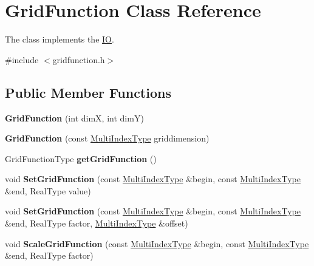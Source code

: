 \hypertarget{class_grid_function}{\section{Grid\-Function Class Reference}
\label{class_grid_function}
}


The class implements the \hyperlink{class_i_o}{I\-O}.  




{\ttfamily \#include $<$gridfunction.\-h$>$}

\subsection*{Public Member Functions}
\begin{DoxyCompactItemize}
\item 
\hypertarget{class_grid_function_a798c74f3481fc35a7ce39e2136fc96c5}{{\bfseries Grid\-Function} (int dim\-X, int dim\-Y)}\label{class_grid_function_a798c74f3481fc35a7ce39e2136fc96c5}

\item 
\hypertarget{class_grid_function_a7e13b13c332e7278317d927271d8f495}{{\bfseries Grid\-Function} (const \hyperlink{class_array}{Multi\-Index\-Type} griddimension)}\label{class_grid_function_a7e13b13c332e7278317d927271d8f495}

\item 
\hypertarget{class_grid_function_a22f2c9d48993df03e959bbe74569660a}{Grid\-Function\-Type {\bfseries get\-Grid\-Function} ()}\label{class_grid_function_a22f2c9d48993df03e959bbe74569660a}

\item 
\hypertarget{class_grid_function_a64fce241fb08877d1b8289fe755c2a2f}{void {\bfseries Set\-Grid\-Function} (const \hyperlink{class_array}{Multi\-Index\-Type} \&begin, const \hyperlink{class_array}{Multi\-Index\-Type} \&end, Real\-Type value)}\label{class_grid_function_a64fce241fb08877d1b8289fe755c2a2f}

\item 
\hypertarget{class_grid_function_adc4e126ab14dd32a55243cb75b1c2083}{void {\bfseries Set\-Grid\-Function} (const \hyperlink{class_array}{Multi\-Index\-Type} \&begin, const \hyperlink{class_array}{Multi\-Index\-Type} \&end, Real\-Type factor, \hyperlink{class_array}{Multi\-Index\-Type} \&offset)}\label{class_grid_function_adc4e126ab14dd32a55243cb75b1c2083}

\item 
\hypertarget{class_grid_function_a8970655a48c5af01d053593bdd475068}{void {\bfseries Scale\-Grid\-Function} (const \hyperlink{class_array}{Multi\-Index\-Type} \&begin, const \hyperlink{class_array}{Multi\-Index\-Type} \&end, Real\-Type factor)}\label{class_grid_function_a8970655a48c5af01d053593bdd475068}


\end{DoxyCompactItemize}
